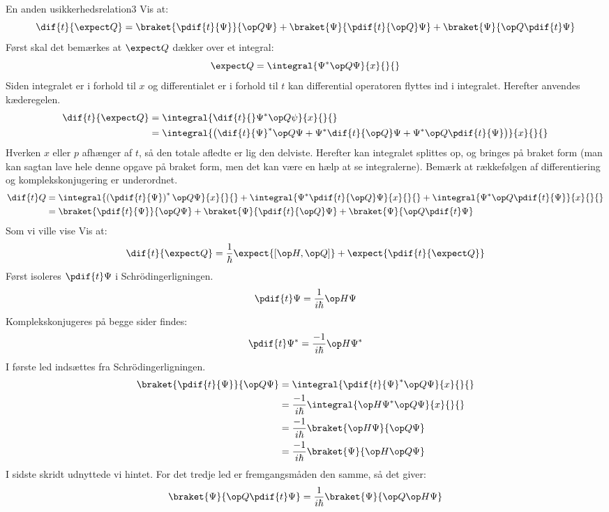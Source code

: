 \begin{opgave}{En anden usikkerhedsrelation}{3}
\opg Vis at:
$$
\dif{t}{\expect Q} = \braket{\pdif{t}{\Psi}}{\op Q\Psi}+\braket{\Psi}{\pdif{t}{\op Q}\Psi}+\braket{\Psi}{\op Q \pdif{t} \Psi}
$$
Først skal det bemærkes at $\expect Q$ dækker over et integral:
$$
\expect Q = \integral{\Psi^*\op Q\Psi}{x}{}{}
$$
Siden integralet er i forhold til $x$ og differentialet er i forhold til $t$ kan differential operatoren flyttes ind i integralet. Herefter anvendes kæderegelen.
\begin{align*}
\dif{t}{\expect Q} &= \integral{\dif{t}{}\Psi^*\op Q\psi}{x}{}{}\\
&= \integral{\left(\dif{t}{\Psi}^*\op Q\Psi+\Psi^*\dif{t}{\op Q}\Psi+\Psi^*\op Q\pdif{t}{\Psi}\right)}{x}{}{}
\end{align*}
Hverken $x$ eller $p$ afhænger af $t$, så den totale afledte er lig den delviste.  Herefter kan integralet splittes op, og bringes på braket form (man kan sagtan lave hele denne opgave på braket form, men det kan være en hælp at se integralerne). Bemærk at rækkefølgen af differentiering og komplekskonjugering er underordnet.
\begin{align*}
\dif{t}Q&= \integral{\left(\pdif{t}{\Psi}\right)^*\op Q\Psi}{x}{}{}+\integral{\Psi^*\pdif{t}{\op Q}\Psi}{x}{}{}+\integral{\Psi^*\op Q\pdif{t}{\Psi}}{x}{}{}\\
&=\braket{\pdif{t}{\Psi}}{\op Q\Psi}+\braket{\Psi}{\pdif{t}{\op Q}\Psi}+\braket{\Psi}{\op Q \pdif{t} \Psi}
\end{align*}
Som vi ville vise
\opg Vis at:
$$
\dif{t}{\expect Q} = \frac{1}{\hbar}\expect{[\op H,\op Q]}+\expect{\pdif{t}{\expect Q}}
$$
Først isoleres $\pdif{t}\Psi$ i Schrödingerligningen.
$$
\pdif{t}\Psi = \frac{1}{i\hbar}\op H\Psi
$$
Komplekskonjugeres på begge sider findes:
$$
\pdif{t}\Psi^* = \frac{-1}{i\hbar}\op H\Psi^*
$$
I første led indsættes fra Schrödingerligningen.
\begin{align*}
\braket{\pdif{t}{\Psi}}{\op Q\Psi} &= \integral{\pdif{t}{\Psi}^*\op Q\Psi}{x}{}{}\\
&=\frac{-1}{i\hbar}\integral{\op H\Psi^*\op Q\Psi}{x}{}{}\\
&=\frac{-1}{i\hbar}\braket{\op H\Psi}{\op Q\Psi}\\
&= \frac{-1}{i\hbar}\braket{\Psi}{\op H \op Q \Psi}\\
\end{align*}
I sidste skridt udnyttede vi hintet.
For det tredje led er fremgangsmåden den samme, så det giver:
$$
\braket{\Psi}{\op Q\pdif{t}\Psi} = \frac{1}{i\hbar}\braket{\Psi}{\op Q\op H\Psi}
$$
\end{opgave}
